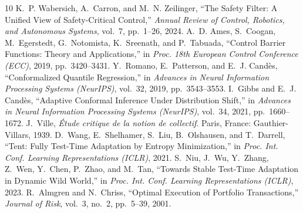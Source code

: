 \documentclass[conference]{IEEEtran}
\begin{document}
\begin{thebibliography}{10}
K.~P. Wabersich, A.~Carron, and M.~N. Zeilinger, ``The Safety Filter: A Unified View of Safety-Critical Control,'' \emph{Annual Review of Control, Robotics, and Autonomous Systems}, vol.~7, pp.~1--26, 2024.
A.~D. Ames, S.~Coogan, M.~Egerstedt, G.~Notomista, K.~Sreenath, and P.~Tabuada, ``Control Barrier Functions: Theory and Applications,'' in \emph{Proc. 18th European Control Conference (ECC)}, 2019, pp.~3420--3431.
Y.~Romano, E.~Patterson, and E.~J. Cand\`es, ``Conformalized Quantile Regression,'' in \emph{Advances in Neural Information Processing Systems (NeurIPS)}, vol.~32, 2019, pp.~3543--3553.
I.~Gibbs and E.~J. Cand\`es, ``Adaptive Conformal Inference Under Distribution Shift,'' in \emph{Advances in Neural Information Processing Systems (NeurIPS)}, vol.~34, 2021, pp.~1660--1672.
J.~Ville, \emph{\'Etude critique de la notion de collectif}. Paris, France: Gauthier-Villars, 1939.
D.~Wang, E.~Shelhamer, S.~Liu, B.~Olshausen, and T.~Darrell, ``Tent: Fully Test-Time Adaptation by Entropy Minimization,'' in \emph{Proc. Int. Conf. Learning Representations (ICLR)}, 2021.
S.~Niu, J.~Wu, Y.~Zhang, Z.~Wen, Y.~Chen, P.~Zhao, and M.~Tan, ``Towards Stable Test-Time Adaptation in Dynamic Wild World,'' in \emph{Proc. Int. Conf. Learning Representations (ICLR)}, 2023.
R.~Almgren and N.~Chriss, ``Optimal Execution of Portfolio Transactions,'' \emph{Journal of Risk}, vol.~3, no.~2, pp.~5--39, 2001.
\end{thebibliography}
\end{document}
